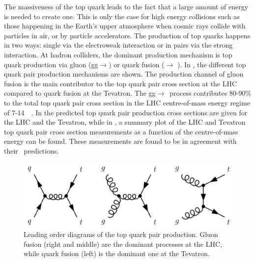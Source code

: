 The massiveness of the top quark leads to the fact that a large amount of energy is needed to create one. This is only the case for high energy collisions such as those happening in the Earth's upper atmosphere when cosmic rays collide with particles in air, or by particle accelerators. The production of top quarks happens in two ways: single via the electroweak interaction or in pairs via the strong interaction. At hadron colliders, the dominant production mechanism is top quark production via gluon (gg$\rightarrow$\ttbar) or quark fusion (\qqbar $\rightarrow$ \ttbar). In , the different top quark pair production mechanisms are shown. The production channel of gluon fusion is the main contributor to the top quark pair cross section at the LHC compared to quark fusion at the Tevatron. %
The gg$\rightarrow$\ttbar\ process contributes 80-90\% to the total top quark pair cross section in the LHC centre-of-mass energy regime of 7-14~\TeV~\cite{PDG}. In  the predicted top quark pair production cross sections are given for the LHC and the Tevatron, while in , a summary plot of the LHC and Tevatron top quark pair cross section measurements as a function of the centre-of-mass energy can be found. These measurements are found to be in agreement with their \SM\ predictions. 
\begin{figure}[htbp]
	\centering
	\includegraphics[width=0.7\linewidth]{1_Introduction/Figures/toppair}
	\caption{Leading order diagrams of the top quark pair production. Gluon fusion (right and middle) are the dominant processes at the LHC, while quark fusion (left) is the dominant one at the Tevatron. }
	\label{fig:toppairproduction}
\end{figure}
